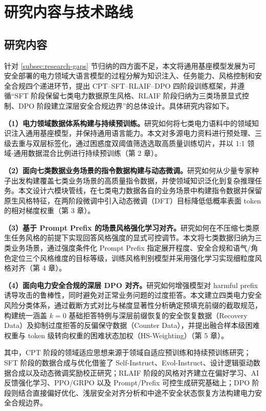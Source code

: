 \documentclass[fontset=fandol,type=master,campus=shenzhen,etitleauto=true]{hithesisbook}
\begin{document}
\section{研究内容与技术路线}\label{ux7814ux7a76ux5185ux5bb9ux4e0eux65b9ux6cd5}

\subsection{研究内容}

针对 \ref{subsec:research-gaps} 节归纳的四方面不足，本文将通用基座模型发展为可安全部署的电力领域大语言模型的过程分解为知识注入、任务能力、风格控制和安全合规四个递进环节，提出 CPT--SFT--RLAIF--DPO 四阶段训练框架，并遵循“SFT 阶段保留七类电力数据原生风格、RLAIF 阶段归纳为三类场景显式控制、DPO 阶段建立深层安全合规边界”的总体设计。具体研究内容如下。

\textbf{（1）电力领域数据体系构建与持续预训练。}研究如何将七类电力语料中的领域知识注入通用基座模型，并保持通用语言能力。本文对多源电力资料进行预处理、三级去重与双层标签化，通过困惑度双阈值筛选选取高质量训练切片，并以 1:1 领域-通用数据混合比例进行持续预训练（第 2 章）。

\textbf{（2）面向七类数据业务场景的指令数据构建与动态微调。}研究如何从少量专家种子出发构建覆盖七类业务场景的高质量指令数据，并使领域知识泛化到复杂推理任务。本文设计六模块管线，在七类电力数据各自的业务场景中构建指令数据并保留原生风格特征，在两阶段微调中引入动态微调（DFT）目标降低低概率表面 token 的相对梯度权重（第 3 章）。

\textbf{（3）基于 Prompt Prefix 的场景风格强化学习对齐。}研究如何在不压缩七类原生任务风格的前提下实现回答风格强度的显式可控调节。本文将七类数据归纳为三类业务场景，通过强度条件化 Prompt Prefix 指定展开程度、安全合规和语气/角色定位三个风格维度的目标等级，训练风格判别模型并采用强化学习实现细粒度风格对齐（第 4 章）。

\textbf{（4）面向电力安全合规的深层 DPO 对齐。}研究如何增强模型对 harmful prefix 诱导攻击的鲁棒性，同时避免对正常业务问题的过度拒答。本文建立四类电力安全风险分类体系，通过截断方式对比与梯度显著性分析确定预填充前缀的截取规范，构建统一涵盖 $k=0$ 基础拒答特例与深层前缀恢复的安全恢复数据（Recovery Data）及抑制过度拒答的反偏保守数据（Counter Data），并提出融合样本级困难权重与 token 级转向权重的困难状态加权（HS-Weighting）（第 5 章）。

其中，CPT 阶段的领域适应思想来源于领域自适应预训练和持续预训练研究\cite{ref6,ref52}；SFT 阶段的数据合成与优化借鉴了 Self-Instruct、Evol-Instruct、设计逻辑驱动数据合成以及动态微调奖励校正研究\cite{ref24,ref25,ref53,ref54,ref82}；RLAIF 阶段的风格对齐建立在偏好学习、AI 反馈强化学习、PPO/GRPO 以及 Prompt/Prefix 可控生成研究基础上\cite{ref30,ref31,ref32,ref44,ref90,ref33,ref34,ref35,ref36,ref37,ref38,ref39}；DPO 阶段则结合直接偏好优化、浅层安全对齐分析和中途不安全状态恢复方法构建电力安全合规边界\cite{ref40,ref44,ref45,ref46,ref47,ref48,ref83,ref84}。
\end{document}
